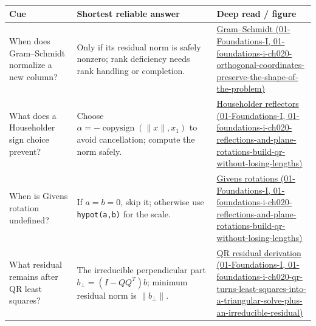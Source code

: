 {\def\LTcaptype{none} %
\begin{longtable}[]{@{}
  >{\raggedright\arraybackslash}p{}
  >{\raggedright\arraybackslash}p{}
  >{\raggedright\arraybackslash}p{}@{}}
\toprule\noalign{}
\begin{minipage}[b]{\linewidth}\raggedright
Cue
\end{minipage} & \begin{minipage}[b]{\linewidth}\raggedright
Shortest reliable answer
\end{minipage} & \begin{minipage}[b]{\linewidth}\raggedright
Deep read / figure
\end{minipage} \\
\midrule\noalign{}
\endhead
\bottomrule\noalign{}
\endlastfoot
When does Gram--Schmidt normalize a new column? & Only if its residual norm is safely nonzero; rank deficiency needs rank handling or completion. & \href{../01-Foundations-I/main.pdf\#nameddest=01-foundations-i-ch020-orthogonal-coordinates-preserve-the-shape-of-the-problem}{Gram--Schmidt (01-Foundations-I, 01-foundations-i-ch020-orthogonal-coordinates-preserve-the-shape-of-the-problem)} \\
What does a Householder sign choice prevent? & Choose \(\alpha=-\operatorname{copysign}(\|x\|,x_1)\) to avoid cancellation; compute the norm safely. & \href{../01-Foundations-I/main.pdf\#nameddest=01-foundations-i-ch020-reflections-and-plane-rotations-build-qr-without-losing-lengths}{Householder reflectors (01-Foundations-I, 01-foundations-i-ch020-reflections-and-plane-rotations-build-qr-without-losing-lengths)} \\
When is Givens rotation undefined? & If \(a=b=0\), skip it; otherwise use \texttt{hypot(a,b)} for the scale. & \href{../01-Foundations-I/main.pdf\#nameddest=01-foundations-i-ch020-reflections-and-plane-rotations-build-qr-without-losing-lengths}{Givens rotations (01-Foundations-I, 01-foundations-i-ch020-reflections-and-plane-rotations-build-qr-without-losing-lengths)} \\
What residual remains after QR least squares? & The irreducible perpendicular part \(b_\perp=(I-QQ^T)b\); minimum residual norm is \(\|b_\perp\|\). & \href{../01-Foundations-I/main.pdf\#nameddest=01-foundations-i-ch020-qr-turns-least-squares-into-a-triangular-solve-plus-an-irreducible-residual}{QR residual derivation (01-Foundations-I, 01-foundations-i-ch020-qr-turns-least-squares-into-a-triangular-solve-plus-an-irreducible-residual)} \\

\end{longtable}}
